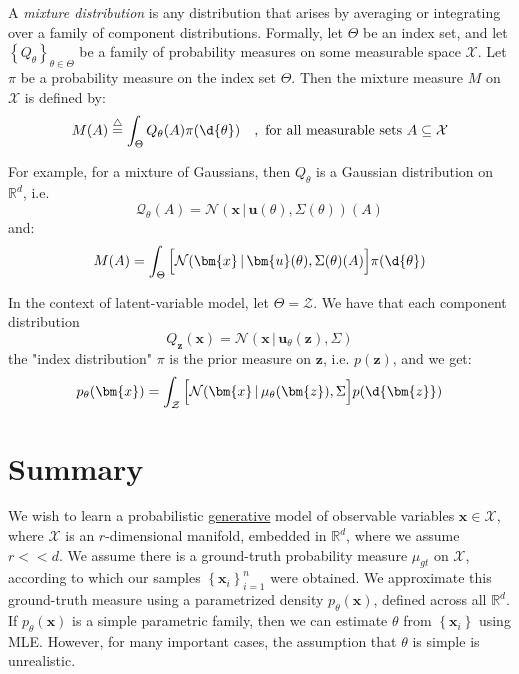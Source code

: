 \documentclass{article}
\begin{document}
\begin{definition}  A \textit{mixture distribution} is any distribution that arises by averaging or integrating over a family of component distributions. Formally, let $\Theta$ be an index set, and let $\left\{ Q_{\theta} \right\}_{\theta \in \Theta}$ be a family of probability measures on some measurable space $\mathcal{X}$. Let $\pi$ be a probability measure on the index set $\Theta$. Then the mixture measure $M$ on $\mathcal{X}$ is defined by:
\[
  M(A) \stackrel{\triangle}{=} \int_{\Theta} Q_{\theta}(A) \pi(\d{\theta}) \quad, \text{ for all measurable sets } A \subseteq \mathcal{X}
\]

For example, for a mixture of Gaussians, then $Q_{\theta}$ is a Gaussian distribution on $\mathbb{R}^{d}$, i.e. 
\[
  \mathcal{Q}_{\theta}(A) = \mathcal{N}(\bm{x} \, | \,  \bm{u}(\theta), \Sigma(\theta)) (A)
\]
and:
\[
  M(A) = \int_{\Theta} \Big[ \mathcal{N}(\bm{x} \, | \, \bm{u}(\theta), \Sigma(\theta) (A) \Big] \pi(\d{\theta})
\]


  In the context of latent-variable model, let $\Theta = \mathcal{Z}$. We have that each component distribution
  \[
    Q_{\bm{z}}(\bm{x} ) = \mathcal{N}( \bm{x} \, | \,  \bm{u}_{\theta}(\bm{z}), \Sigma)
  \]
  the "index distribution" $\pi$ is the prior measure on $\bm{z}$, i.e. $p(\bm{z})$, and we get:
  \[
    p_{\theta}(\bm{x}) = \int_{\mathcal{Z}} \Big[ \mathcal{N} (\bm{x} \, | \,  \mu_{\theta}(\bm{z}), \Sigma \Big] p(\d{\bm{z}})
  \]
\end{definition}

\section{Summary}
We wish to learn a probabilistic \ul{generative} model of observable variables $\bm{x} \in \mathcal{X}$, where $\mathcal{X}$ is an $r$-dimensional manifold, embedded in $\mathbb{R}^{d}$, where we assume $r << d$. 
We assume there is a ground-truth probability measure $\mu_{gt}$ on $\mathcal{X}$, according to which our samples $\left\{ \bm{x}_i \right\}_{i=1}^{n}$ were obtained. 
We approximate this ground-truth measure using a parametrized density $p_{\theta}(\bm{x})$, defined across all $\mathbb{R}^{d}$. If $p_{\theta}(\bm{x})$ is a simple parametric family, then we can estimate $\theta$ from $\left\{  \bm{x}_i \right\}$ using MLE. However, for many important cases, the assumption that $\theta$ is simple is unrealistic. 
\end{document}
